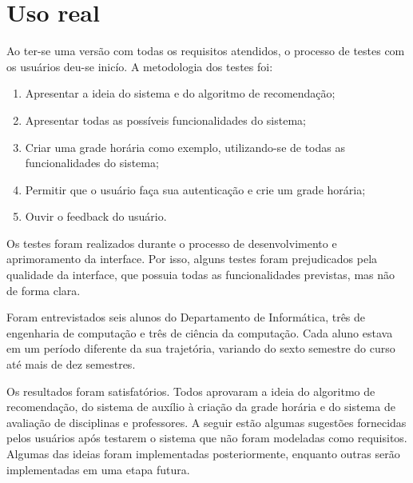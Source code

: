 \chapter{Uso real}
\label{cha:Uso real}

Ao ter-se uma versão com todas os requisitos atendidos, o processo de testes com os usuários deu-se inicío. A metodologia dos testes foi:

\begin{enumerate}
    \item Apresentar a ideia do sistema e do algoritmo de recomendação;
    \item Apresentar todas as possíveis funcionalidades do sistema;
    \item Criar uma grade horária como exemplo, utilizando-se de todas as funcionalidades do sistema;
    \item Permitir que o usuário faça sua autenticação e crie um grade horária;
    \item Ouvir o feedback do usuário.
\end{enumerate}

Os testes foram realizados durante o processo de desenvolvimento e aprimoramento da interface. Por isso, alguns testes foram prejudicados pela qualidade da interface, que possuia todas as funcionalidades previstas, mas não de forma clara.

Foram entrevistados seis alunos do Departamento de Informática, três de engenharia de computação e três de ciência da computação. Cada aluno estava em um período diferente da sua trajetória, variando do sexto semestre do curso até mais de dez semestres.

Os resultados foram satisfatórios. Todos aprovaram a ideia do algoritmo de recomendação, do sistema de auxílio à criação da grade horária e do sistema de avaliação de disciplinas e professores. A seguir estão algumas sugestões fornecidas pelos usuários após testarem o sistema que não foram modeladas como requisitos. Algumas das ideias foram implementadas posteriormente, enquanto outras serão implementadas em uma etapa futura.


